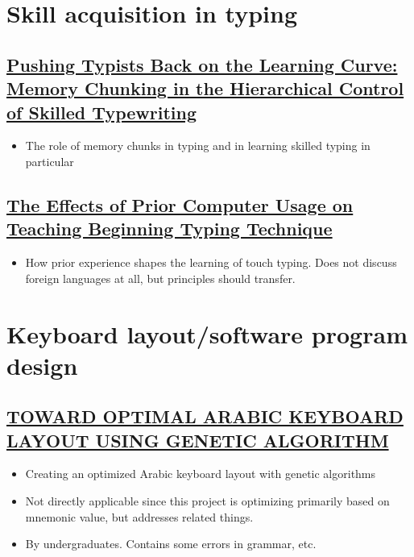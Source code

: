 \documentclass[11pt]{article}
\begin{document}
\section{Skill acquisition in typing}
\label{sec:org7cdb0d4}

\subsection{\href{https://www.researchgate.net/publication/304362539\_Pushing\_Typists\_Back\_on\_the\_Learning\_Curve\_Memory\_Chunking\_in\_the\_Hierarchical\_Control\_of\_Skilled\_Typewriting}{Pushing Typists Back on the Learning Curve: Memory Chunking in the Hierarchical Control of Skilled Typewriting}}
\label{sec:org322627a}

\begin{itemize}
\item The role of memory chunks in typing and in learning skilled typing in particular
\end{itemize}

\subsection{\href{https://www.jstor.org/stable/41063973}{The Effects of Prior Computer Usage on Teaching Beginning Typing Technique}}
\label{sec:org1e8cf53}

\begin{itemize}
\item How prior experience shapes the learning of touch typing. Does not discuss foreign languages at all, but principles should transfer.
\end{itemize}

\section{Keyboard layout/software program design}
\label{sec:org559d414}

\subsection{\href{https://pdfs.semanticscholar.org/1bf8/74dcaa7f21c2cc3c6c5e526b61a9ee352bba.pdf}{TOWARD OPTIMAL ARABIC KEYBOARD LAYOUT USING GENETIC ALGORITHM}}
\label{sec:orgc5af1c3}

\begin{itemize}
\item Creating an optimized Arabic keyboard layout with genetic algorithms
\item Not directly applicable since this project is optimizing primarily based on mnemonic value, but addresses related things.
\item By undergraduates. Contains some errors in grammar, etc.
\end{itemize}
\end{document}
